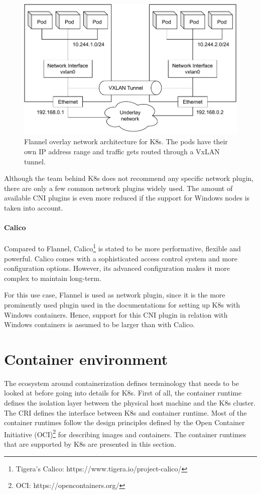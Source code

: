 \begin{figure}[h]
	\centering
	\includegraphics[width=.95\textwidth]{Figures/flannel-network.pdf}
	\caption{Flannel overlay network architecture for \ac{K8s}\cite{Schott.2019}. The pods have their own \ac{IP} address range and traffic gets routed through a \ac{VxLAN} tunnel.}
	\label{fig:design.flannel-network}
\end{figure}

Although the team behind \ac{K8s} does not recommend any specific network plugin, there are only a few common network plugins widely used. The amount of available \ac{CNI} plugins is even more reduced if the support for \ac{Windows} nodes is taken into account.

\paragraph*{Calico}
Compared to Flannel, Calico\footnote{Tigera's Calico: https://www.tigera.io/project-calico/} is stated to be more performative, flexible and powerful\cite{SuseRancherCommunity.20230212,Tigera.20230210}. Calico comes with a sophisticated access control system\cite{Tigera.20230210} and more configuration options. However, its advanced configuration makes it more complex to maintain long-term.

For this use case, Flannel is used as network plugin, since it is the more prominently used plugin used in the documentations for setting up \ac{K8s} with \ac{Windows} containers\cite{GitHubKubernetesSIGWindowsTools.20230213,Kubernetes.20220419}. Hence, support for this \ac{CNI} plugin in relation with \ac{Windows} containers is assumed to be larger than with Calico.




\section{Container environment}
The ecosystem around containerization defines terminology that needs to be looked at before going into details for \ac{K8s}. First of all, the container runtime defines the isolation layer between the physical host machine and the \ac{K8s} cluster. The \acf{CRI} defines the interface between \ac{K8s} and container runtime. Most of the container runtimes follow the design principles defined by the Open Container Initiative (OCI)\footnote{OCI: https://opencontainers.org/} for describing images and containers.
The container runtimes that are supported by \ac{K8s} are presented in this section.


